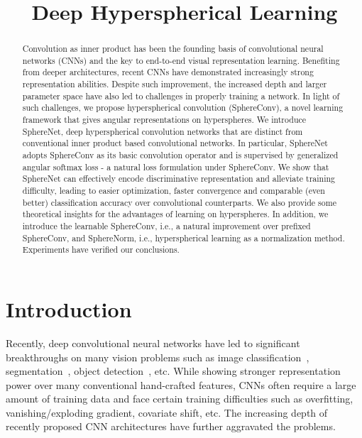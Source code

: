 \title{Deep Hyperspherical Learning}

\begin{abstract}
Convolution as inner product has been the founding basis of convolutional neural networks (CNNs) and the key to end-to-end visual representation learning. Benefiting from deeper architectures, recent CNNs have demonstrated increasingly strong representation abilities. Despite such improvement, the increased depth and larger parameter space have also led to challenges in properly training a network. In light of such challenges, we propose hyperspherical convolution (SphereConv), a novel learning framework that gives angular representations on hyperspheres. We introduce SphereNet, deep hyperspherical convolution networks that are distinct from conventional inner product based convolutional networks. In particular, SphereNet adopts SphereConv as its basic convolution operator and is supervised by generalized angular softmax loss - a natural loss formulation under SphereConv. We show that SphereNet can effectively encode discriminative representation and alleviate training difficulty, leading to easier optimization, faster convergence and comparable (even better) classification accuracy over convolutional counterparts. We also provide some theoretical insights for the advantages of learning on hyperspheres. In addition, we introduce the learnable SphereConv, i.e., a natural improvement over prefixed SphereConv, and SphereNorm, i.e., hyperspherical learning as a normalization method. Experiments have verified our conclusions.
\end{abstract}

\section{Introduction}
Recently, deep convolutional neural networks have led to significant breakthroughs on many vision problems such as image classification~\cite{krizhevsky2012imagenet, simonyan2014very, szegedy2015going, he2015deep}, segmentation~\cite{girshick2014rich,long2015fully,Chen2015}, object detection~\cite{girshick2014rich,ren2015faster}, etc. While showing stronger representation power over many conventional hand-crafted features, CNNs often require a large amount of training data and face certain training difficulties such as overfitting, vanishing/exploding gradient, covariate shift, etc. The increasing depth of recently proposed CNN architectures have further aggravated the problems.

